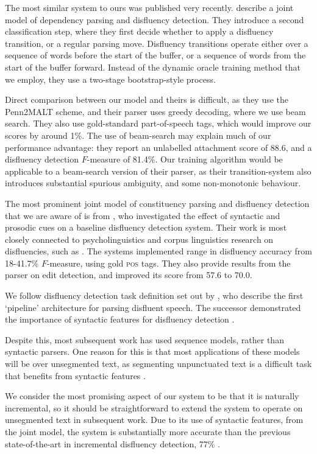 \documentclass[11pt,letterpaper]{article}
\begin{document}
The most similar system to ours was published very recently.
\citet{rasooli:13} describe a joint model of dependency
parsing and disfluency detection. They introduce a second classification step,
where they first decide whether to apply a disfluency transition, or a regular
parsing move. Disfluency transitions operate either over a sequence of words
before the start of the buffer, or a sequence of words from the start of the
buffer forward. Instead of the dynamic oracle training method that we employ,
they use a two-stage bootstrap-style process.

Direct comparison between our model and theirs is difficult,
as they use the Penn2MALT scheme, and their parser uses greedy decoding, where we use
beam search. They also use gold-standard part-of-speech tags, which would
improve our scores by around 1\%.
The use of beam-search may explain much of our performance advantage:
they report an unlabelled attachment score of 88.6, and a disfluency detection
$F$-measure of 81.4\%.  Our training algorithm would be applicable to a
beam-search version of their parser, as their transition-system also introduces
substantial spurious ambiguity, and some non-monotonic behaviour.

The most prominent joint model of constituency parsing and disfluency detection
that we are aware of is from \citet{hale:06}, who investigated the effect of
syntactic and prosodic cues on a baseline disfluency detection system.  Their
work is most closely connected to psycholinguistics and corpus linguistics research
on disfluencies, such as \citet{shriberg:98}. The systems \citeauthor{hale:06}
implemented range in disfluency accuracy from
18-41.7\% $F$-measure, using gold \textsc{pos} tags. They also provide results
from the  \citet{Charniak01a} parser on edit detection, and improved its score
from 57.6 to 70.0.

We follow disfluency detection task definition set out by 
\citet{Charniak01b}, who describe the first `pipeline' architecture for parsing
disfluent speech.  The successor
demonstrated the importance of syntactic features for disfluency detection
\citep{Johnson04a}.

Despite this, most subsequent work has used sequence models, rather than syntactic
parsers.  One reason for this is that most applications of these models will be
over unsegmented text, as segmenting unpunctuated text
is a difficult task that benefits from syntactic features \citep{zhang:13}.

We consider the most promising aspect of our system to be that it is naturally
incremental, so it should be straightforward to extend the system to operate
on unsegmented text in subsequent work.  Due to its use of syntactic features,
from the joint model, the system is substantially more accurate than the previous
state-of-the-art in incremental disfluency detection, 77\% \citep{zwarts:10}.
\end{document}
